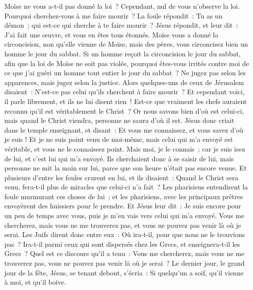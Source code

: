 \begin{multicols}{2}
Moïse ne vous a-t-il pas donné la loi~? Cependant, nul de vous n'observe la loi. Pourquoi cherchez-vous à me faire mourir~?
La foule répondit~: Tu as un démon~; qui est-ce qui cherche à te faire mourir~?
Jésus répondit, et leur dit~: J'ai fait une œuvre, et vous en êtes tous étonnés.
Moïse vous a donné la circoncision, non qu'elle vienne de Moïse, mais des pères, vous circoncisez bien un homme le jour du sabbat.
Si un homme reçoit la circoncision le jour du sabbat, afin que la loi de Moïse ne soit pas violée, pourquoi êtes-vous irrités contre moi de ce que j'ai guéri un homme tout entier le jour du sabbat~?
Ne jugez pas selon les apparences, mais jugez selon la justice.
Alors quelques-uns de ceux de Jérusalem disaient~: N'est-ce pas celui qu'ils cherchent à faire mourir~?
Et cependant voici, il parle librement, et ils ne lui disent rien~! Est-ce que vraiment les chefs auraient reconnu qu'il est véritablement le Christ~?
Or nous savons bien d'où est celui-ci, mais quand le Christ viendra, personne ne saura d'où il est.
Jésus donc criait dans le temple enseignant, et disant~: Et vous me connaissez, et vous savez d'où je suis ! Et je ne suis point venu de moi-même, mais celui qui m'a envoyé est véritable, et vous ne le connaissez point. 
Mais moi, je le connais~; car je suis issu de lui, et c'est lui qui m'a envoyé.
Ils cherchaient donc à se saisir de lui, mais personne ne mit la main sur lui, parce que son heure n'était pas encore venue.
Et plusieurs d'entre les foules crurent en lui, et ils disaient~: Quand le Christ sera venu, fera-t-il plus de miracles que celui-ci n'a fait~?
Les pharisiens entendirent la foule murmurant ces choses de lui~; et les pharisiens, avec les principaux prêtres envoyèrent des huissiers pour le prendre.
Et Jésus leur dit~: Je suis encore pour un peu de temps avec vous, puis je m'en vais vers celui qui m'a envoyé.
Vous me chercherez, mais vous ne me trouverez pas, et vous ne pouvez pas venir là où je serai.
Les Juifs dirent donc entre eux~: Où ira-t-il, pour que nous ne le trouvions pas~? Ira-t-il parmi ceux qui sont dispersés chez les Grecs, et enseignera-t-il les Grecs~?
Quel est ce discours qu'il a tenu~: Vous me chercherez, mais vous ne me trouverez pas, vous ne pouvez pas venir là où je serai~?
Le dernier jour, le grand jour de la fête, Jésus, se tenant debout, s'écria~: Si quelqu'un a soif, qu'il vienne à moi, et qu'il boive.

\end{multicols}
